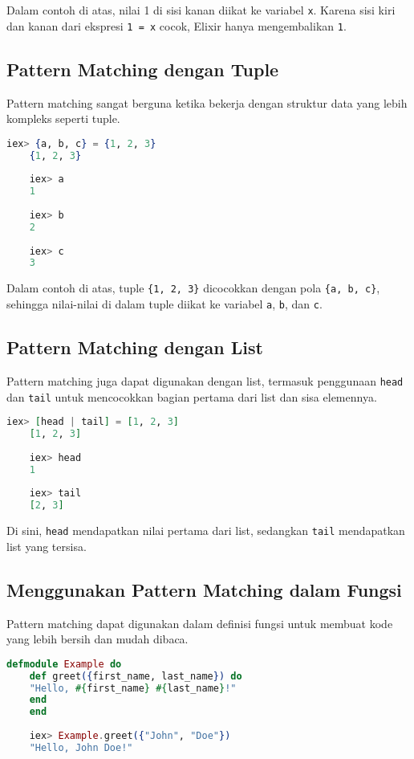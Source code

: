 Dalam contoh di atas, nilai 1 di sisi kanan diikat ke variabel \texttt{x}. Karena sisi kiri dan kanan dari ekspresi \texttt{1 = x} cocok, Elixir hanya mengembalikan \texttt{1}.

\subsection{Pattern Matching dengan Tuple}

Pattern matching sangat berguna ketika bekerja dengan struktur data yang lebih kompleks seperti tuple.

\begin{lstlisting}[language=Elixir]
	iex> {a, b, c} = {1, 2, 3}
	{1, 2, 3}
	
	iex> a
	1
	
	iex> b
	2
	
	iex> c
	3
\end{lstlisting}

Dalam contoh di atas, tuple \texttt{\{1, 2, 3\}} dicocokkan dengan pola \texttt{\{a, b, c\}}, sehingga nilai-nilai di dalam tuple diikat ke variabel \texttt{a}, \texttt{b}, dan \texttt{c}.

\subsection{Pattern Matching dengan List}

Pattern matching juga dapat digunakan dengan list, termasuk penggunaan \texttt{head} dan \texttt{tail} untuk mencocokkan bagian pertama dari list dan sisa elemennya.

\begin{lstlisting}[language=Elixir]
	iex> [head | tail] = [1, 2, 3]
	[1, 2, 3]
	
	iex> head
	1
	
	iex> tail
	[2, 3]
\end{lstlisting}

Di sini, \texttt{head} mendapatkan nilai pertama dari list, sedangkan \texttt{tail} mendapatkan list yang tersisa.

\subsection{Menggunakan Pattern Matching dalam Fungsi}

Pattern matching dapat digunakan dalam definisi fungsi untuk membuat kode yang lebih bersih dan mudah dibaca.

\begin{lstlisting}[language=Elixir]
	defmodule Example do
	def greet({first_name, last_name}) do
	"Hello, #{first_name} #{last_name}!"
	end
	end
	
	iex> Example.greet({"John", "Doe"})
	"Hello, John Doe!"
\end{lstlisting}

